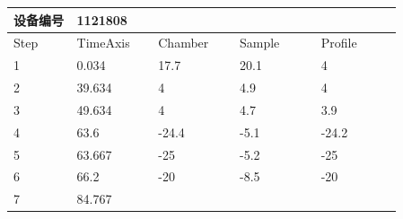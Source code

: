 \documentclass[UTF8,10pt,a4paper,fontset=fandol]{ctexart}
\newcommand{\fieldvalue}[1]{#1}
\begin{document}
\begin{center}
\begin{tabular}{|p{0.14\linewidth}|p{0.18\linewidth}|p{0.18\linewidth}|p{0.18\linewidth}|p{0.18\linewidth}|}
\hline
设备编号 &
\fieldvalue{1121808} &
\multicolumn{3}{c|}{}\\
\hline
Step & TimeAxis & Chamber & Sample & Profile\\
\hline
1 &
\fieldvalue{0.034} &
\fieldvalue{17.7} &
\fieldvalue{20.1} &
\fieldvalue{4}\\
\hline
2 &
\fieldvalue{39.634} &
\fieldvalue{4} &
\fieldvalue{4.9} &
\fieldvalue{4}\\
\hline
3 &
\fieldvalue{49.634} &
\fieldvalue{4} &
\fieldvalue{4.7} &
\fieldvalue{3.9}\\
\hline
4 &
\fieldvalue{63.6} &
\fieldvalue{-24.4} &
\fieldvalue{-5.1} &
\fieldvalue{-24.2}\\
\hline
5 &
\fieldvalue{63.667} &
\fieldvalue{-25} &
\fieldvalue{-5.2} &
\fieldvalue{-25}\\
\hline
6 &
\fieldvalue{66.2} &
\fieldvalue{-20} &
\fieldvalue{-8.5} &
\fieldvalue{-20}\\
\hline
7 &
\fieldvalue{84.767} &

\end{tabular}
\end{center}
\end{document}
